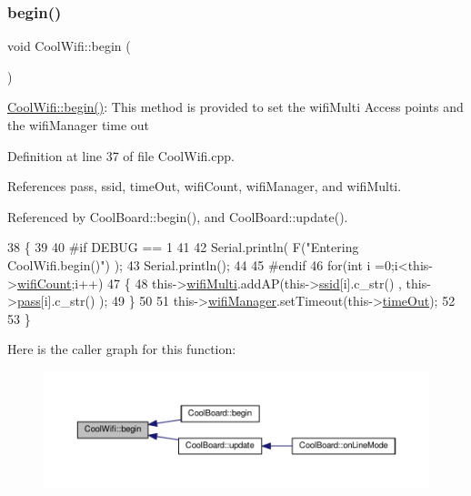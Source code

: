 \subsubsection{\texorpdfstring{begin()}{begin()}}
{\footnotesize\ttfamily void Cool\+Wifi\+::begin (\begin{DoxyParamCaption}{ }\end{DoxyParamCaption})}

\hyperlink{classCoolWifi_a46942fed90e475112cc10b78a32e7aaa}{Cool\+Wifi\+::begin()}\+: This method is provided to set the wifi\+Multi Access points and the wifi\+Manager time out 

Definition at line 37 of file Cool\+Wifi.\+cpp.



References pass, ssid, time\+Out, wifi\+Count, wifi\+Manager, and wifi\+Multi.



Referenced by Cool\+Board\+::begin(), and Cool\+Board\+::update().


\begin{DoxyCode}
38 \{ 
39 
40 \textcolor{preprocessor}{#if DEBUG == 1 }
41 
42     Serial.println( F(\textcolor{stringliteral}{"Entering CoolWifi.begin()"}) );
43     Serial.println();
44 
45 \textcolor{preprocessor}{#endif}
46     \textcolor{keywordflow}{for}(\textcolor{keywordtype}{int} i =0;i<this->\hyperlink{classCoolWifi_ab133bd92fcb895b884deecd6678592e4}{wifiCount};i++)
47     \{
48          this->\hyperlink{classCoolWifi_a7862a8c0d7239877e2956c14a368aab8}{wifiMulti}.addAP(this->\hyperlink{classCoolWifi_a893b21d0fed821438733bba2e73fb4c2}{ssid}[i].c\_str() , this->\hyperlink{classCoolWifi_a0c3332a149245aaad060b32593a54c9b}{pass}[i].c\_str() );    
49     \}
50     
51     this->\hyperlink{classCoolWifi_a80dd24fdc56e863f5eb9947dd65a433a}{wifiManager}.setTimeout(this->\hyperlink{classCoolWifi_a952111605f25156588b5632caaba1c6f}{timeOut});  
52     
53 \}
\end{DoxyCode}
Here is the caller graph for this function\+:
\nopagebreak
\begin{figure}[H]
\begin{center}
\leavevmode
\includegraphics[width=350pt]{classCoolWifi_a46942fed90e475112cc10b78a32e7aaa_icgraph}
\end{center}
\end{figure}
\mbox{\label{classCoolWifi_a4eb2f6b9b09dd588964b88b6c70122c0}} 
